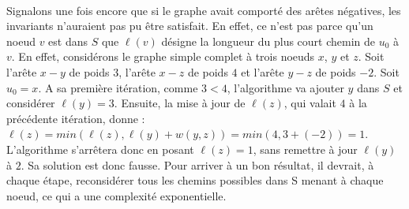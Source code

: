 \paragraph{}

Signalons une fois encore que si le graphe avait comporté des arêtes négatives, les invariants n'auraient pas pu être satisfait. En effet, ce n'est pas parce qu'un noeud $v$ est dans $S$ que $\ell(v)$ désigne la longueur du plus court chemin de $u_0$ à $v$. En effet, considérons le graphe simple complet à trois noeuds $x$, $y$ et $z$. Soit l'arête $x-y$ de poids $3$, l'arête $x-z$ de poids $4$ et l'arête $y-z$ de poids $-2$. Soit $u_0=x$. A sa première itération, comme $3 < 4$, l'algorithme va ajouter $y$ dans $S$ et considérer $\ell(y)=3$. Ensuite, la mise à jour de $\ell(z)$, qui valait $4$ à la précédente itération, donne : $\ell(z)=min(\ell(z),\ell(y)+w(y,z))=min(4,3+(-2))=1$. L'algorithme s'arrêtera donc en posant $\ell(z)=1$, sans remettre à jour $\ell(y)$ à $2$. Sa solution est donc fausse. Pour arriver à un bon résultat, il devrait, à chaque étape, reconsidérer tous les chemins possibles dans S menant à chaque noeud, ce qui a une complexité exponentielle.
 
